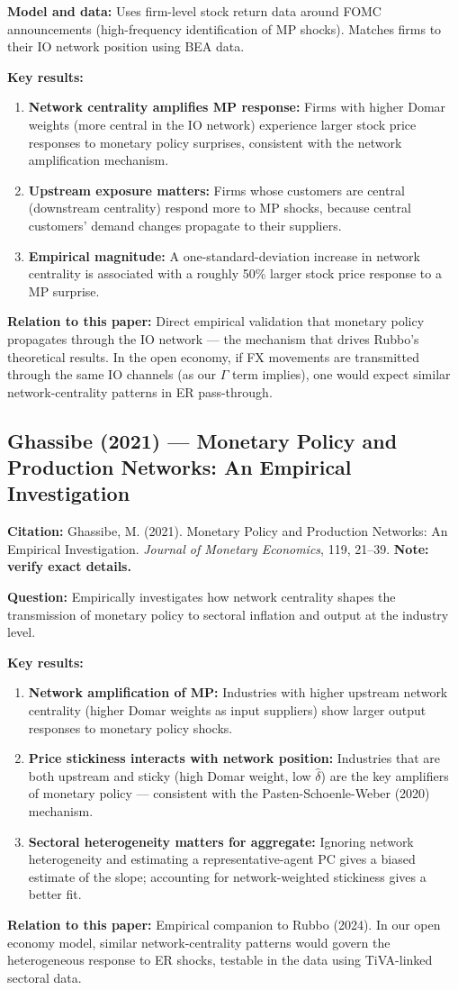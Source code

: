 \documentclass[12pt]{article}
\begin{document}
\textbf{Model and data:} Uses firm-level stock return data around FOMC announcements (high-frequency identification of MP shocks). Matches firms to their IO network position using BEA data.

\textbf{Key results:}
\begin{enumerate}
    \item \textbf{Network centrality amplifies MP response:} Firms with higher Domar weights (more central in the IO network) experience larger stock price responses to monetary policy surprises, consistent with the network amplification mechanism.
    \item \textbf{Upstream exposure matters:} Firms whose customers are central (downstream centrality) respond more to MP shocks, because central customers' demand changes propagate to their suppliers.
    \item \textbf{Empirical magnitude:} A one-standard-deviation increase in network centrality is associated with a roughly 50\% larger stock price response to a MP surprise.
\end{enumerate}

\textbf{Relation to this paper:} Direct empirical validation that monetary policy propagates through the IO network --- the mechanism that drives Rubbo's theoretical results. In the open economy, if FX movements are transmitted through the same IO channels (as our $\Gamma$ term implies), one would expect similar network-centrality patterns in ER pass-through.

\subsection{Ghassibe (2021) --- Monetary Policy and Production Networks: An Empirical Investigation}

\textbf{Citation:} Ghassibe, M. (2021). Monetary Policy and Production Networks: An Empirical Investigation. \textit{Journal of Monetary Economics}, 119, 21--39. \textbf{Note: verify exact details.}

\textbf{Question:} Empirically investigates how network centrality shapes the transmission of monetary policy to sectoral inflation and output at the industry level.

\textbf{Key results:}
\begin{enumerate}
    \item \textbf{Network amplification of MP:} Industries with higher upstream network centrality (higher Domar weights as input suppliers) show larger output responses to monetary policy shocks.
    \item \textbf{Price stickiness interacts with network position:} Industries that are both upstream and sticky (high Domar weight, low $\hat{\delta}$) are the key amplifiers of monetary policy --- consistent with the Pasten-Schoenle-Weber (2020) mechanism.
    \item \textbf{Sectoral heterogeneity matters for aggregate:} Ignoring network heterogeneity and estimating a representative-agent PC gives a biased estimate of the slope; accounting for network-weighted stickiness gives a better fit.
\end{enumerate}

\textbf{Relation to this paper:} Empirical companion to Rubbo (2024). In our open economy model, similar network-centrality patterns would govern the heterogeneous response to ER shocks, testable in the data using TiVA-linked sectoral data.
\end{document}
